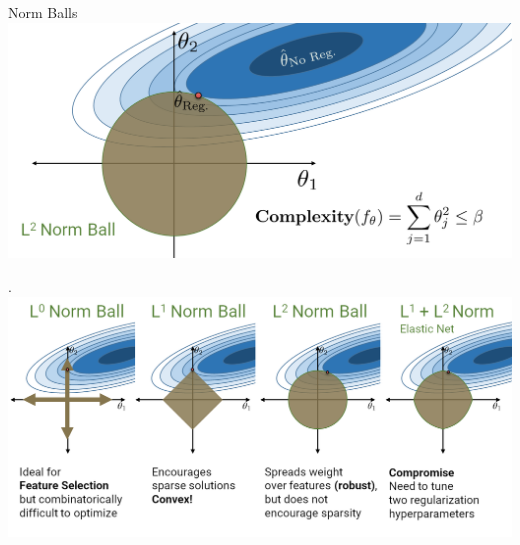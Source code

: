 \documentclass[aspectratio=169]{../latex_main/tntbeamer}  %
\begin{document}
	
	\begin{frame}{Norm Balls}
	    \includegraphics[scale=.35]{Bild16}
	\end{frame}
	
	\begin{frame}{.}
	    \includegraphics[scale=.4]{Bild17}
	\end{frame}
\end{document}
